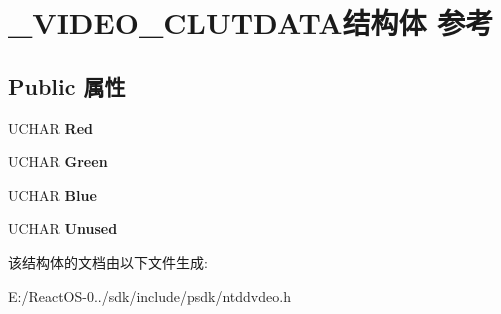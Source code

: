 \hypertarget{struct___v_i_d_e_o___c_l_u_t_d_a_t_a}{}\section{\+\_\+\+V\+I\+D\+E\+O\+\_\+\+C\+L\+U\+T\+D\+A\+T\+A结构体 参考}
\label{struct___v_i_d_e_o___c_l_u_t_d_a_t_a}
\subsection*{Public 属性}
\begin{DoxyCompactItemize}
\item 
\mbox{\label{struct___v_i_d_e_o___c_l_u_t_d_a_t_a_ae6c08705d4504e2b78f00e6589a59f2b}} 
U\+C\+H\+AR {\bfseries Red}
\item 
\mbox{\label{struct___v_i_d_e_o___c_l_u_t_d_a_t_a_a6a88143c574bb4160b796ab97837b499}} 
U\+C\+H\+AR {\bfseries Green}
\item 
\mbox{\label{struct___v_i_d_e_o___c_l_u_t_d_a_t_a_a0e2a10b22c2ddd4dae19b3182a4470d2}} 
U\+C\+H\+AR {\bfseries Blue}
\item 
\mbox{\label{struct___v_i_d_e_o___c_l_u_t_d_a_t_a_a7cfbe14b3cd08b331895b50c2e0d38d4}} 
U\+C\+H\+AR {\bfseries Unused}
\end{DoxyCompactItemize}


该结构体的文档由以下文件生成\+:\begin{DoxyCompactItemize}
\item 
E\+:/\+React\+O\+S-\/0../sdk/include/psdk/ntddvdeo.\+h\end{DoxyCompactItemize}
